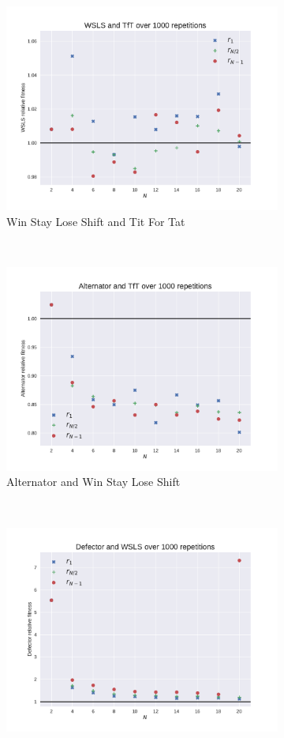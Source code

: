 \documentclass{article}
\begin{document}
\begin{figure}[!hbtp]
    \begin{subfigure}[t]{.3\textwidth}
        \centering
        \includegraphics[width=.8\textwidth]{./img/WSLS_v_TfT_fitness.pdf}
        \caption{Win Stay Lose Shift and Tit For Tat}
    \end{subfigure}%
    ~
    \begin{subfigure}[t]{.3\textwidth}
        \centering
        \includegraphics[width=.8\textwidth]{./img/Alternator_v_TfT_fitness.pdf}
        \caption{Alternator and Win Stay Lose Shift}
    \end{subfigure}%
    ~
    \begin{subfigure}[t]{.3\textwidth}
        \centering
        \includegraphics[width=.8\textwidth]{./img/Defector_v_WSLS_fitness.pdf}

\end{subfigure}
\end{figure}
\end{document}
